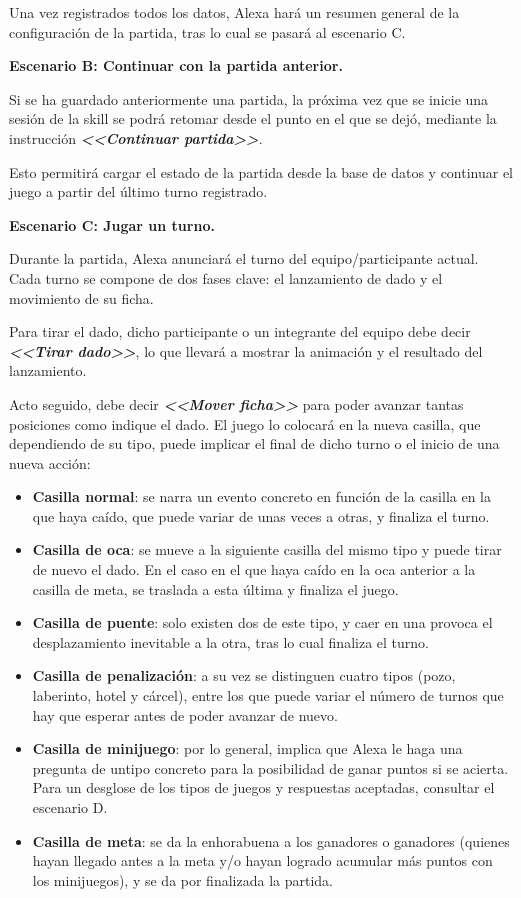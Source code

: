 Una vez registrados todos los datos, Alexa hará un resumen general de la configuración de la partida, tras lo cual se pasará al escenario C.

\vspace{0.5cm}

\textbf{Escenario B: Continuar con la partida anterior.}

Si se ha guardado anteriormente una partida, la próxima vez que se inicie una sesión de la skill se podrá retomar desde el punto en el que se dejó, mediante la instrucción \textbf{\textit{<<Continuar partida>>}}.

Esto permitirá cargar el estado de la partida desde la base de datos y continuar el juego a partir del último turno registrado.

\vspace{0.5cm}

\textbf{Escenario C: Jugar un turno.}

Durante la partida, Alexa anunciará el turno del equipo/participante actual. Cada turno se compone de dos fases clave: el lanzamiento de dado y el movimiento de su ficha.

Para tirar el dado, dicho participante o un integrante del equipo debe decir \textbf{\textit{<<Tirar dado>>}}, lo que llevará a mostrar la animación y el resultado del lanzamiento.

Acto seguido, debe decir \textbf{\textit{<<Mover ficha>>}} para poder avanzar tantas posiciones como indique el dado. El juego lo colocará en la nueva casilla, que dependiendo de su tipo, puede implicar el final de dicho turno o el inicio de una nueva acción:
 \begin{itemize}
 	\item \textbf{Casilla normal}: se narra un evento concreto en función de la casilla en la que haya caído, que puede variar de unas veces a otras, y finaliza el turno.
 	\item \textbf{Casilla de oca}: se mueve a la siguiente casilla del mismo tipo y puede tirar de nuevo el dado. En el caso en el que haya caído en la oca anterior a la casilla de meta, se traslada a esta última y finaliza el juego.
 	\item \textbf{Casilla de puente}: solo existen dos de este tipo, y caer en una provoca el desplazamiento inevitable a la otra, tras lo cual finaliza el turno. 
 	\item \textbf{Casilla de penalización}: a su vez se distinguen cuatro tipos (pozo, laberinto, hotel y cárcel), entre los que puede variar el número de turnos que hay que esperar antes de poder avanzar de nuevo.
 	\item \textbf{Casilla de minijuego}: por lo general, implica que Alexa le haga una pregunta de untipo concreto para la posibilidad de ganar puntos si se acierta. Para un desglose de los tipos de juegos y respuestas aceptadas, consultar el escenario D.
 	\item \textbf{Casilla de meta}: se da la enhorabuena a los ganadores o ganadores (quienes hayan llegado antes a la meta y/o hayan logrado acumular más puntos con los minijuegos), y se da por finalizada la partida.
 \end{itemize}

